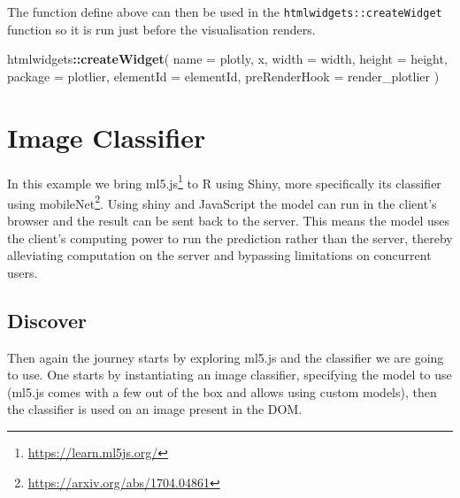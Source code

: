 \documentclass[
]{krantz}
\makeatletter
\newenvironment{Shaded}{\begin{snugshade}}{\end{snugshade}}
\newcommand{\ControlFlowTok}[1]{\textcolor[rgb]{0.27,0.27,0.27}{\textbf{#1}}}
\newcommand{\DataTypeTok}[1]{\textcolor[rgb]{0.27,0.27,0.27}{#1}}
\newcommand{\KeywordTok}[1]{\textcolor[rgb]{0.27,0.27,0.27}{\textbf{#1}}}
\newcommand{\NormalTok}[1]{#1}
\newcommand{\OperatorTok}[1]{\textcolor[rgb]{0.43,0.43,0.43}{\textbf{#1}}}
\newcommand{\OtherTok}[1]{\textcolor[rgb]{0.37,0.37,0.37}{#1}}
\newcommand{\StringTok}[1]{\textcolor[rgb]{0.5,0.5,0.5}{#1}}
\renewcommand{\href}[2]{#2\footnote{\url{#1}}}
\newenvironment{kframe}{%
\medskip{}
\setlength{\fboxsep}{.8em}
 \def\at@end@of@kframe{}%
 \ifinner\ifhmode%
  \def\at@end@of@kframe{\end{minipage}}%
  \begin{minipage}{\columnwidth}%
 \fi\fi%
 \def\FrameCommand##1{\hskip\@totalleftmargin \hskip-\fboxsep
 \colorbox{shadecolor}{##1}\hskip-\fboxsep
     \hskip-\linewidth \hskip-\@totalleftmargin \hskip\columnwidth}%
 \MakeFramed {\advance\hsize-\width
   \@totalleftmargin\z@ \linewidth\hsize
   \@setminipage}}%
 {\par\unskip\endMakeFramed%
 \at@end@of@kframe}
\renewenvironment{Shaded}{\begin{kframe}}{\end{kframe}}
\makeatother
\begin{document}
\begin{Shaded}
\end{Shaded}

The function define above can then be used in the \texttt{htmlwidgets::createWidget} function so it is run just before the visualisation renders.

\begin{Shaded}
\begin{Highlighting}[]
\NormalTok{htmlwidgets}\OperatorTok{::}\KeywordTok{createWidget}\NormalTok{(}
  \DataTypeTok{name =} \StringTok{\textquotesingle{}plotly\textquotesingle{}}\NormalTok{,}
\NormalTok{  x,}
  \DataTypeTok{width =}\NormalTok{ width,}
  \DataTypeTok{height =}\NormalTok{ height,}
  \DataTypeTok{package =} \StringTok{\textquotesingle{}plotlier\textquotesingle{}}\NormalTok{,}
  \DataTypeTok{elementId =}\NormalTok{ elementId,}
  \DataTypeTok{preRenderHook =}\NormalTok{ render\_plotlier}
\NormalTok{)}
\end{Highlighting}
\end{Shaded}

\hypertarget{image-classifier}{%
\chapter{Image Classifier}\label{image-classifier}}

In this example we bring \href{https://learn.ml5js.org/}{ml5.js} to R using Shiny, more specifically its classifier using \href{https://arxiv.org/abs/1704.04861}{mobileNet}. Using shiny and JavaScript the model can run in the client's browser and the result can be sent back to the server. This means the model uses the client's computing power to run the prediction rather than the server, thereby alleviating computation on the server and bypassing limitations on concurrent users.

\hypertarget{discover-1}{%
\section*{Discover}\label{discover-1}}


Then again the journey starts by exploring ml5.js and the classifier we are going to use. One starts by instantiating an image classifier, specifying the model to use (ml5.js comes with a few out of the box and allows using custom models), then the classifier is used on an image present in the DOM.
\end{document}
